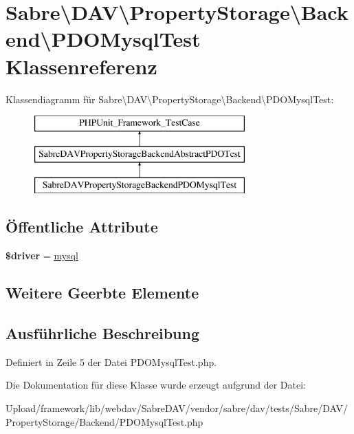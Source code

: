 \hypertarget{class_sabre_1_1_d_a_v_1_1_property_storage_1_1_backend_1_1_p_d_o_mysql_test}{}\section{Sabre\textbackslash{}D\+AV\textbackslash{}Property\+Storage\textbackslash{}Backend\textbackslash{}P\+D\+O\+Mysql\+Test Klassenreferenz}
\label{class_sabre_1_1_d_a_v_1_1_property_storage_1_1_backend_1_1_p_d_o_mysql_test}
Klassendiagramm für Sabre\textbackslash{}D\+AV\textbackslash{}Property\+Storage\textbackslash{}Backend\textbackslash{}P\+D\+O\+Mysql\+Test\+:\begin{figure}[H]
\begin{center}
\leavevmode
\includegraphics[height=3.000000cm]{class_sabre_1_1_d_a_v_1_1_property_storage_1_1_backend_1_1_p_d_o_mysql_test}
\end{center}
\end{figure}
\subsection*{Öffentliche Attribute}
\begin{DoxyCompactItemize}
\item 
\mbox{\label{class_sabre_1_1_d_a_v_1_1_property_storage_1_1_backend_1_1_p_d_o_mysql_test_aae3a8eb12d6e325ede3922b5c08521da}} 
{\bfseries \$driver} = \textquotesingle{}\mbox{\hyperlink{classmysql}{mysql}}\textquotesingle{}
\end{DoxyCompactItemize}
\subsection*{Weitere Geerbte Elemente}


\subsection{Ausführliche Beschreibung}


Definiert in Zeile 5 der Datei P\+D\+O\+Mysql\+Test.\+php.



Die Dokumentation für diese Klasse wurde erzeugt aufgrund der Datei\+:\begin{DoxyCompactItemize}
\item 
Upload/framework/lib/webdav/\+Sabre\+D\+A\+V/vendor/sabre/dav/tests/\+Sabre/\+D\+A\+V/\+Property\+Storage/\+Backend/P\+D\+O\+Mysql\+Test.\+php\end{DoxyCompactItemize}
